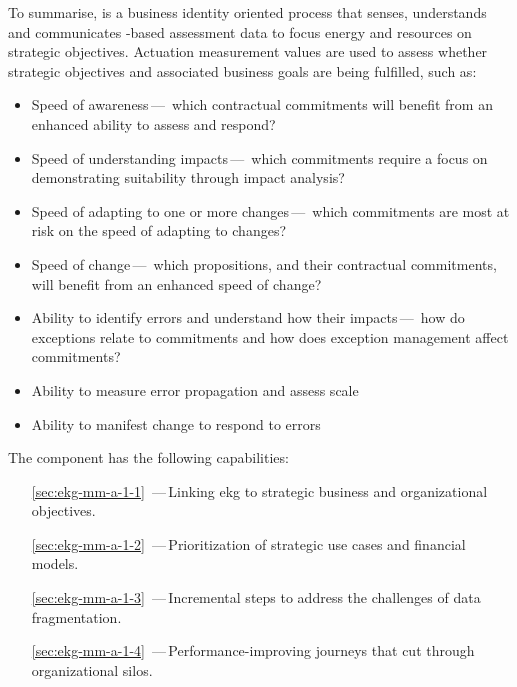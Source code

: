 To summarise, \textbf{} is a business identity oriented process
that senses, understands and communicates -based assessment data to focus energy and
resources on strategic objectives.
Actuation measurement values are used to assess whether strategic objectives and associated business goals are
being fulfilled, such as:

\begin{itemize}
    \item Speed of awareness\,---\,%
          which contractual commitments will benefit from an enhanced ability to assess and respond?
    \item Speed of understanding impacts\,---\,%
          which commitments require a focus on demonstrating suitability through impact analysis?
    \item Speed of adapting to one or more changes\,---\,%
          which commitments are most at risk on the speed of adapting to changes?
    \item Speed of change\,---\,%
          which propositions, and their contractual commitments, will benefit from an enhanced speed of change?
    \item Ability to identify errors and understand how their impacts\,---\,%
          how do exceptions relate to commitments and how does exception management affect commitments?
    \item Ability to measure error propagation and assess scale
    \item Ability to manifest change to respond to errors
\end{itemize}

The  component has the following capabilities:

\begin{itemize}[leftmargin=.5in]
  \item [\ref{sec:ekg-mm-a-1-1}] \,---\,Linking \gls{ekg} to strategic business and organizational objectives.
  \item [\ref{sec:ekg-mm-a-1-2}] \,---\,Prioritization of strategic use cases and financial models.
  \item [\ref{sec:ekg-mm-a-1-3}] \,---\,Incremental steps to address the challenges of data fragmentation.
  \item [\ref{sec:ekg-mm-a-1-4}] \,---\,Performance-improving journeys that cut through organizational silos.
\end{itemize}






